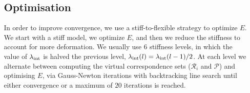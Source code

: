 \subsection{Optimisation}
In order to improve convergence, we use a stiff-to-flexible strategy to optimize $E$. We start with a stiff model, we optimize $E$, and then we reduce the stiffness to account for more deformation.
We usually use $6$ stiffness levels, in which the value of $\lambda_{\text{int}}$ is halved \wrt the previous level, \ie $\lambda_{\text{int}}(l)=\lambda_{\text{int}}(l-1)/2$.
At each level we alternate between computing the virtual correspondence sets ($\mathcal{R}_i$ and $\mathcal{P}$) and optimising $E$, via Gauss-Newton iterations with backtracking line search until either convergence or a maximum of $20$ iterations is reached.
